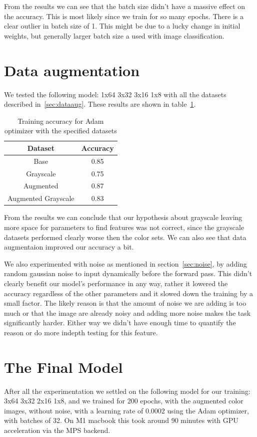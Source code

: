 \documentclass[12pt,a4paper,english
]{tunithesis}
\begin{document}
From the results we can see that the batch size didn't have a massive effect on the accuracy. This is most likely since we train for so many epochs. There is a clear outlier in batch size of 1. This might be due to a lucky change in initial weights, but generally larger batch size a used with image classification.

\section{Data augmentation}
We tested the following model: 1x64 3x32 3x16 1x8 with all the datasets described in~\ref{sec:dataaug}. These results are shown in table~\ref{tab:dataaug}.
\begin{table}[h!]
\centering
\caption{Training accuracy for Adam optimizer with the specified datasets}
\begin{tabular}{|c|c|}
\hline
\textbf{Dataset} & \textbf{Accuracy} \\ \hline
Base & 0.85 \\ \hline
Grayscale & 0.75 \\ \hline
Augmented & 0.87  \\ \hline
Augmented Grayscale & 0.83  \\ \hline
\end{tabular}
\label{tab:dataaug}
\end{table}

From the results we can conclude that our hypothesis about grayscale leaving more space for parameters to find features was not correct, since the grayscale datasets performed clearly worse then the color sets. We can also see that data augmentaion improved our accuracy a bit.

We also experimented with noise as mentioned in section~\ref{sec:noise}, by adding random gaussian noise to input dynamically before the forward pass. This didn't clearly benefit our model's performance in any way, rather it lowered the accuracy regardless of the other parameters and it slowed down the training by a small factor. The likely reason is that the amount of noise we are adding is too much or that the image are already noisy and adding more noise makes the task significantly harder. Either way we didn't have enough time to quantify the reason or do more indepth testing for this feature.

\section{The Final Model}
After all the experimentation we settled on the following model for our training: 3x64 3x32 2x16 1x8, and we trained for 200 epochs, with the augmented color images, without noise, with a learning rate of $0.0002$ using the Adam optimizer, with batches of 32. On M1 macbook this took around 90 minutes with GPU acceleration via the MPS backend.
\end{document}
